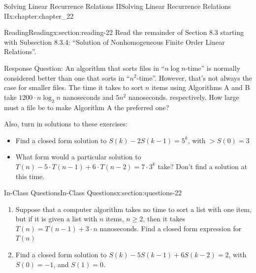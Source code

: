\documentclass[oneside,10pt,]{book}
\numberwithin{equation}{section}
\begin{document}
%
%
\typeout{************************************************}
\typeout{************************************************}
%
\begin{chapterptx}{Solving Linear Recurrence Relations II}{}{Solving Linear Recurrence Relations II}{}{}{x:chapter:chapter_22}
\index{}%
%
%
\typeout{************************************************}
\typeout{************************************************}
%
\begin{sectionptx}{Reading}{}{Reading}{}{}{x:section:reading-22}
Read the remainder of Section 8.3 starting with Subsection 8.3.4: “Solution of Nonhomogeneous Finite Order Linear Relations”.%
\par
Response Question: An algorithm that sorts files in ``\(n \log{n}\)-time'' is normally considered better than one that sorts in ``\(n^2\)-time''.  However, that's not always the case for smaller files.  The time it takes to sort \(n\) items using Algorithms A and B take \(1200\cdot n \log_2{n}\) nanoseconds and \(5 n^2\) nanoseconds. respectively. How large must a file be to make Algorithm A the preferred one?%
\par
Also, turn in solutions to these exercises:%
\begin{itemize}[label=\textbullet]
\item{}Find a closed form solution to \(S(k) - 2 S (k - 1) = 5^k\), with \(>S(0) = 3\)%
\item{}What form would a particular solution to \(T(n)-5\cdot T(n-1)+6\cdot T(n-2)=7 \cdot 3^k\) take?  Don't find a solution at this time.%
\end{itemize}
%
\end{sectionptx}
%
%
\typeout{************************************************}
\typeout{************************************************}
%
\begin{sectionptx}{In-Class Questions}{}{In-Class Questions}{}{}{x:section:questions-22}
%
\begin{enumerate}[label=\arabic*.]
\item{}Suppose that a computer algorithm takes no time to sort a list with one item, but if it is given a list with \(n\) items, \(n \geq 2\), then it takes \(T(n) = T(n-1) + 3\cdot n\) nanoseconds.  Find a closed form expression for \(T(n)\)%
\item{}Find a closed form solution to \(S(k) - 5S(k - 1) + 6S(k - 2) = 2\), with \(S(0) = -1\), and \(S(1) = 0\).%

\end{enumerate}
\end{sectionptx}
\end{chapterptx}
\end{document}
